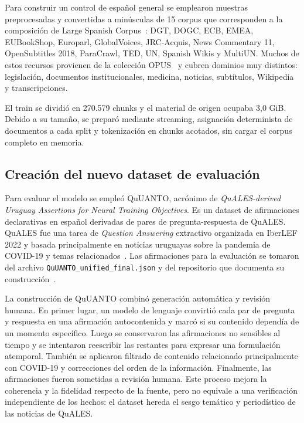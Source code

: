 \documentclass[11pt,a4paper]{article}
\newcommand{\code}[1]{\texttt{#1}}
\begin{document}
Para construir un control de español general se emplearon muestras
preprocesadas y convertidas a minúsculas de 15 corpus que corresponden a la
composición de Large Spanish Corpus~\cite{canete}: DGT, DOGC, ECB, EMEA,
EUBookShop, Europarl, GlobalVoices, JRC-Acquis, News Commentary 11,
OpenSubtitles 2018, ParaCrawl, TED, UN, Spanish Wikis y MultiUN. Muchos de estos
recursos provienen de la colección OPUS~\cite{opus} y cubren dominios muy
distintos: legislación, documentos institucionales, medicina, noticias,
subtítulos, Wikipedia y transcripciones.

El train se dividió en 270.579 chunks y el material de origen ocupaba
3,0 GiB. Debido a su tamaño, se preparó mediante streaming,
asignación determinista de documentos a cada split y tokenización en chunks
acotados, sin cargar el corpus completo en memoria.


\subsection{Creación del nuevo dataset de evaluación}

Para evaluar el modelo se empleó QuUANTO, acrónimo de \emph{QuALES-derived
Uruguay Assertions for Neural Training Objectives}. Es un dataset de afirmaciones
declarativas en español derivadas de pares de pregunta-respuesta de QuALES. QuALES
fue una tarea de \emph{Question Answering} extractivo organizada en IberLEF 2022 y
basada principalmente en noticias uruguayas sobre la pandemia de COVID-19 y temas
relacionados~\cite{rosa2022}. Las afirmaciones para la evaluación se tomaron del
archivo \code{QuUANTO\_unified\_final.json} y del repositorio que documenta su
construcción~\cite{quanto}.

La construcción de QuUANTO combinó generación automática y revisión humana. En
primer lugar, un modelo de lenguaje convirtió cada par de pregunta y respuesta en
una afirmación autocontenida y marcó si su contenido dependía de un momento
específico. Luego se conservaron las afirmaciones no sensibles al tiempo y se
intentaron reescribir las restantes para expresar una formulación atemporal.
También se aplicaron filtrado de contenido relacionado principalmente con COVID-19
y correcciones del orden de la información. Finalmente, las afirmaciones fueron
sometidas a revisión humana. Este proceso
mejora la coherencia y la fidelidad respecto de la fuente, pero no equivale a una
verificación independiente de los hechos: el dataset hereda el sesgo temático y
periodístico de las noticias de QuALES.
\end{document}
